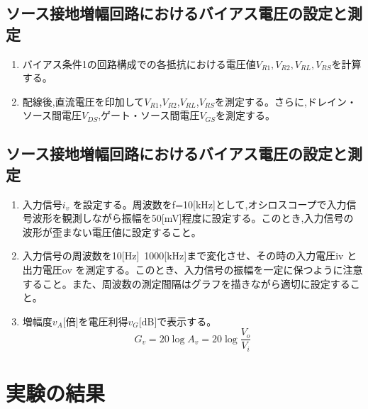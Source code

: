 \documentclass[a4paper,11pt,xelatex,ja=standard]{bxjsarticle}
\begin{document}
    \subsection{ソース接地増幅回路におけるバイアス電圧の設定と測定}
        \begin{enumerate}
            \item バイアス条件1の回路構成での各抵抗における電圧値$V_{R1},V_{R2},V_{RL},V_{RS}$を計算する。
            \item 配線後,直流電圧を印加して$V_{R1}$,$V_{R2}$,$V_{RL}$,$V_{RS}$を測定する。さらに,ドレイン・ソース間電圧$V_{DS}$,ゲート・ソース間電圧$V_{GS}$を測定する。
        \end{enumerate}
    
    \subsection{ソース接地増幅回路におけるバイアス電圧の設定と測定}
        \begin{enumerate}
            \item 入力信号$i_v$ を設定する。周波数をf=10[kHz]として,オシロスコープで入力信号波形を観測しながら振幅を50[mV]程度に設定する。このとき,入力信号の波形が歪まない電圧値に設定すること。
            \item 入力信号の周波数を10[Hz]~1000[kHz]まで変化させ、その時の入力電圧iv と出力電圧ov を測定する。このとき、入力信号の振幅を一定に保つように注意すること。また、周波数の測定間隔はグラフを描きながら適切に設定すること。
            \item 増幅度$v_A$[倍]を電圧利得$v_G$[dB]で表示する。
                \[G_v = 20 \log A_v = 20 \log \frac{V_o}{V_i}\]
        \end{enumerate}

\section{実験の結果}
\end{document}
